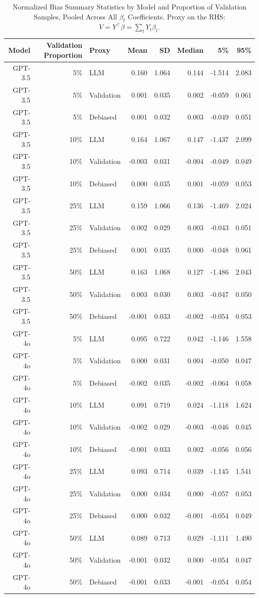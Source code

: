 \begin{table}

\caption{Normalized Bias Summary Statistics by Model and Proportion of Validation Samples, Pooled Across All $\beta_{t}$ Coefficients. Proxy on the RHS: $V = Y^\top \beta = \sum_{t} Y_t \beta_t$.}
\centering
\begin{tabular}[t]{rrlrrrrr}
\toprule
Model & Validation Proportion & Proxy & Mean & SD & Median & 5\% & 95\%\\
\midrule
GPT-3.5 & 5\% & LLM & 0.160 & 1.064 & 0.144 & -1.514 & 2.083\\
GPT-3.5 & 5\% & Validation & 0.001 & 0.035 & 0.002 & -0.059 & 0.061\\
GPT-3.5 & 5\% & Debiased & 0.001 & 0.032 & 0.003 & -0.049 & 0.051\\
GPT-3.5 & 10\% & LLM & 0.164 & 1.067 & 0.147 & -1.437 & 2.099\\
GPT-3.5 & 10\% & Validation & -0.003 & 0.031 & -0.004 & -0.049 & 0.049\\
GPT-3.5 & 10\% & Debiased & 0.000 & 0.035 & 0.001 & -0.059 & 0.053\\
GPT-3.5 & 25\% & LLM & 0.159 & 1.066 & 0.136 & -1.469 & 2.024\\
GPT-3.5 & 25\% & Validation & 0.002 & 0.029 & 0.003 & -0.043 & 0.051\\
GPT-3.5 & 25\% & Debiased & 0.001 & 0.035 & 0.000 & -0.048 & 0.061\\
GPT-3.5 & 50\% & LLM & 0.163 & 1.068 & 0.127 & -1.486 & 2.043\\
GPT-3.5 & 50\% & Validation & 0.003 & 0.030 & 0.003 & -0.047 & 0.050\\
GPT-3.5 & 50\% & Debiased & -0.001 & 0.033 & -0.002 & -0.054 & 0.053\\
GPT-4o & 5\% & LLM & 0.095 & 0.722 & 0.042 & -1.146 & 1.558\\
GPT-4o & 5\% & Validation & 0.000 & 0.031 & 0.004 & -0.050 & 0.047\\
GPT-4o & 5\% & Debiased & -0.002 & 0.035 & -0.002 & -0.064 & 0.058\\
GPT-4o & 10\% & LLM & 0.091 & 0.719 & 0.024 & -1.118 & 1.624\\
GPT-4o & 10\% & Validation & -0.002 & 0.029 & -0.003 & -0.046 & 0.045\\
GPT-4o & 10\% & Debiased & -0.001 & 0.033 & 0.002 & -0.056 & 0.056\\
GPT-4o & 25\% & LLM & 0.093 & 0.714 & 0.039 & -1.145 & 1.541\\
GPT-4o & 25\% & Validation & 0.000 & 0.034 & 0.000 & -0.057 & 0.053\\
GPT-4o & 25\% & Debiased & 0.000 & 0.032 & -0.001 & -0.054 & 0.049\\
GPT-4o & 50\% & LLM & 0.089 & 0.713 & 0.029 & -1.111 & 1.490\\
GPT-4o & 50\% & Validation & -0.001 & 0.032 & 0.000 & -0.054 & 0.047\\
GPT-4o & 50\% & Debiased & -0.001 & 0.033 & -0.001 & -0.054 & 0.054\\
\bottomrule
\end{tabular}
\end{table}
